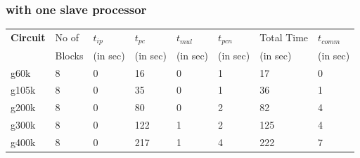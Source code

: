 \documentclass[12pt,psfig,a4]{article}
\begin{document}
\subsubsection{with one slave processor}
\tiny
\begin{table}[ht]
\begin{center}
\begin{tabular}{|l|l|l|l|l|l|l|l|} 
\hline
{\bf Circuit} & No of & $t_{ip}$ & $t_{pc}$ & $t_{mul}$ &  $t_{pcn}$ & Total Time & $t_{comm}$ \\ 
              & Blocks& (in sec)& (in sec)  & (in sec)  &  (in sec)  & (in sec)   & (in sec)   \\ \hline 
g60k&  \hspace{0.2in}8 & \hspace{0.2in}0 & \hspace{0.2in}16& \hspace{0.2in}0& \hspace{0.2in}1& \hspace{0.2in}17& \hspace{0.2in}0     \\ \hline 
g105k& \hspace{0.2in}8 & \hspace{0.2in}0 & \hspace{0.2in}35& \hspace{0.2in}0& \hspace{0.2in}1& \hspace{0.2in}36& \hspace{0.2in}1     \\ \hline 
g200k& \hspace{0.2in}8 & \hspace{0.2in}0 & \hspace{0.2in}80& \hspace{0.2in}0& \hspace{0.2in}2& \hspace{0.2in}82& \hspace{0.2in}4     \\ \hline 
g300k& \hspace{0.2in}8 & \hspace{0.2in}0 & \hspace{0.2in}122& \hspace{0.2in}1& \hspace{0.2in}2& \hspace{0.2in}125& \hspace{0.2in}4   \\ \hline 
g400k& \hspace{0.2in}8 & \hspace{0.2in}0 & \hspace{0.2in}217& \hspace{0.2in}1& \hspace{0.2in}4& \hspace{0.2in}222& \hspace{0.2in}7   \\ \hline 

\end{tabular}
\end{center}
\end{table}
\end{document}
